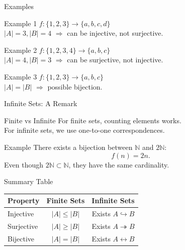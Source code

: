 \documentclass[11pt]{beamer}
\theoremstyle{plain}
\begin{document}
\begin{frame}{Examples}
\begin{exampleblock}{Example 1}
$f:\{1,2,3\}\to\{a,b,c,d\}$ \\
$|A|=3, |B|=4$ $\Rightarrow$ can be injective, not surjective.
\end{exampleblock}

\pause
\begin{exampleblock}{Example 2}
$f:\{1,2,3,4\}\to\{a,b,c\}$ \\
$|A|=4, |B|=3$ $\Rightarrow$ can be surjective, not injective.
\end{exampleblock}

\pause
\begin{exampleblock}{Example 3}
$f:\{1,2,3\}\to\{a,b,c\}$ \\
$|A|=|B|$ $\Rightarrow$ possible bijection.
\end{exampleblock}
\end{frame}

\begin{frame}{Infinite Sets: A Remark}
\begin{block}{Finite vs Infinite}
For finite sets, counting elements works. \\
For infinite sets, we use one-to-one correspondences.
\end{block}

\pause
\begin{exampleblock}{Example}
There exists a bijection between $\mathbb{N}$ and $2\mathbb{N}$:
\[
f(n) = 2n.
\]
Even though $2\mathbb{N} \subset \mathbb{N}$, they have the same cardinality.
\end{exampleblock}
\end{frame}

\begin{frame}{Summary Table}
\begin{table}[h!]
\centering
\renewcommand{\arraystretch}{1.3}
\begin{tabular}{|l|c|c|}
\hline
\textbf{Property} & \textbf{Finite Sets} & \textbf{Infinite Sets} \\ \hline
Injective & $|A|\le |B|$ & Exists $A\hookrightarrow B$ \\ \hline
Surjective & $|A|\ge |B|$ & Exists $A\twoheadrightarrow B$ \\ \hline
Bijective & $|A|=|B|$ & Exists $A\leftrightarrow B$ \\ \hline
\end{tabular}
\end{table}
\end{frame}
\end{document}
